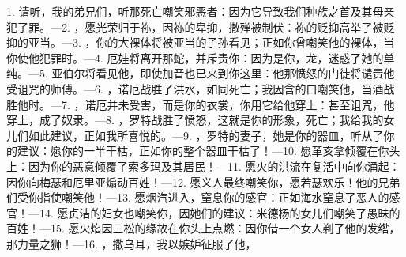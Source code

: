 1. 请听，我的弟兄们，听那死亡嘲笑邪恶者：因为它导致我们种族之首及其母亲犯了罪。—\newline{}2. ，愿光荣归于祢，因祢的卑抑，撒殚被制伏：祢的贬抑高举了被贬抑的亚当。—\newline{}3. ，你的大裸体将被亚当的子孙看见；正如你曾嘲笑他的裸体，当你使他犯罪时。—\newline{}4. 厄娃将离开那蛇，并斥责你：因为是你，龙，迷惑了她的单纯。—\newline{}5. 亚伯尔将看见他，即使加音也已来到你这里：他那愤怒的门徒将谴责他受诅咒的师傅。—\newline{}6. ，诺厄战胜了洪水，如同死亡；我因含的口嘲笑他，当酒战胜他时。—\newline{}7. ，诺厄并未受害，而是你的衣裳，你用它给他穿上：甚至诅咒，他穿上，成了奴隶。—\newline{}8. ，罗特战胜了愤怒，这就是你的形象，死亡；我给我的女儿们如此建议，正如我所喜悦的。—\newline{}9. ，罗特的妻子，她是你的器皿，听从了你的建议：愿你的一半干枯，正如你的整个器皿干枯了！—\newline{}10. 愿革亥拿倾覆在你头上：因为你的恶意倾覆了索多玛及其居民！—\newline{}11. 愿火的洪流在复活中向你涌起：因你向梅瑟和厄里亚煽动百姓！—\newline{}12. 愿义人最终嘲笑你，愿若瑟欢乐！他的兄弟们受你指使嘲笑他！—\newline{}13. 愿烟汽进入，窒息你的感官：正如海水窒息了恶人的感官！—\newline{}14. 愿贞洁的妇女也嘲笑你，因她们的建议：米德杨的女儿们嘲笑了愚昧的百姓！—\newline{}15. 愿火焰因三松的缘故在你头上点燃：因你借一个女人剃了他的发绺，那力量之狮！—\newline{}16. ，撒乌耳，我以嫉妒征服了他，